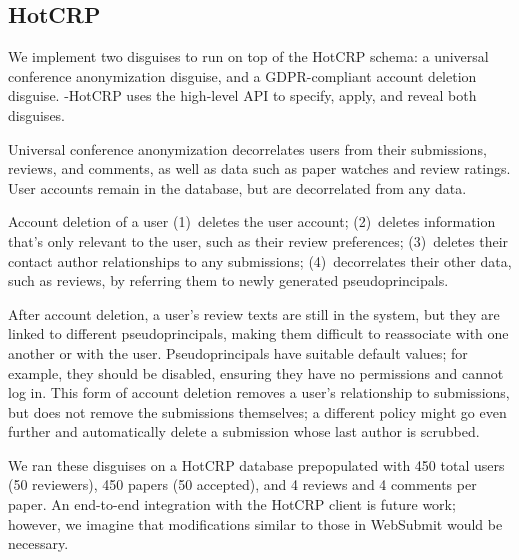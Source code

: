 \subsection{HotCRP}
We implement two disguises to run on top of the HotCRP schema: a universal conference anonymization
disguise, and a GDPR-compliant account deletion disguise.  \sys-HotCRP uses the high-level \sys API
to specify, apply, and reveal both disguises.

Universal conference anonymization decorrelates users from their submissions, reviews, and comments,
as well as data such as paper watches and review ratings. User accounts remain in the database, but
are decorrelated from any data.

 Account deletion of a user 
%
(1)~deletes the user account;
%
(2)~deletes information that's only relevant to the user, such as their review preferences;
%
(3)~deletes their contact author relationships to any submissions;
%
(4)~decorrelates their other data, such as reviews, by referring them to newly generated
pseudoprincipals.

After account deletion, a user's review texts are still in the system, but they are linked to
different pseudoprincipals, making them difficult to reassociate with one another or with the user.
%
Pseudoprincipals have suitable default values; for example, they should be disabled, ensuring they
have no permissions and cannot log in.
%
This form of account deletion removes a user's relationship to submissions, but does not remove the
submissions themselves; a different policy might go even further and automatically delete a
submission whose last author is scrubbed.

We ran these disguises on a HotCRP database prepopulated with 450 total users (50 reviewers), 450
papers (50 accepted), and 4 reviews and 4 comments per paper.  An end-to-end integration with the
HotCRP client is future work; however, we imagine that modifications similar to those in WebSubmit
would be necessary.

